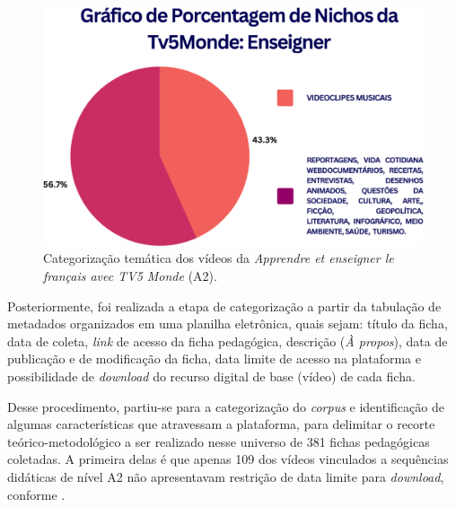 \documentclass[portuguese]{textolivre}
\begin{document}
\begin{figure}[h]
    \centering
    \begin{minipage}{.55\textwidth}
    \includegraphics[width=\linewidth]{Fig3.png}
    \caption{Categorização temática dos vídeos da \textit{Apprendre et enseigner le français avec TV5 Monde} (A2).}
    \label{fig3}
    \end{minipage}
\end{figure}

Posteriormente, foi realizada a etapa de categorização a partir da tabulação de metadados organizados em uma planilha eletrônica, quais sejam: título da ficha, data de coleta, \textit{link} de acesso da ficha pedagógica, descrição (\textit{À propos}), data de publicação e de modificação da ficha, data limite de acesso na plataforma e possibilidade de \textit{download} do recurso digital de base (vídeo) de cada ficha. 

Desse procedimento, partiu-se para a categorização do \textit{corpus} e identificação de algumas características que atravessam a plataforma, para delimitar o recorte teórico-metodológico a ser realizado nesse universo de 381 fichas pedagógicas coletadas. A primeira delas é que apenas 109 dos vídeos vinculados a sequências didáticas de nível A2 não apresentavam restrição de data limite para \textit{download}, conforme .
\end{document}
